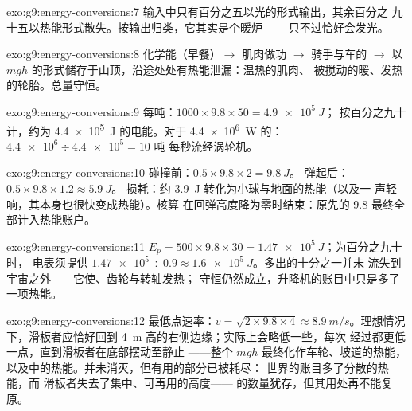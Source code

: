 \begin{solution}{exo:g9:energy-conversions:7}
输入中只有百分之五以光的形式输出，其余百分之
九十五以热能形式散失。按输出归类，它其实是个暖炉——
只不过恰好会发光。
\end{solution}

\begin{solution}{exo:g9:energy-conversions:8}
化学能（早餐）$\to$ 肌肉做功 $\to$ 骑手与车的
 $\to$ 以 $m g
h$ 的形式储存于山顶，沿途处处有热能泄漏：温热的肌肉、
被搅动的暖、发热的轮胎。总量守恒。
\end{solution}

\begin{solution}{exo:g9:energy-conversions:9}
每吨：$1000 \times 9.8 \times 50 = \qty{4.9e5}{J}$；
按百分之九十计，约为 \qty{4.4e5}{J} 的电能。对于
\qty{4.4e6}{W} 的：$\num{4.4e6} \div \num{4.4e5} = 10$ 吨
每秒流经涡轮机。
\end{solution}

\begin{solution}{exo:g9:energy-conversions:10}
碰撞前：$0.5 \times 9.8 \times 2 = \qty{9.8}{J}$。
弹起后：$0.5 \times 9.8 \times 1.2 \approx \qty{5.9}{J}$。
损耗：约 \qty{3.9}{J} 转化为小球与地面的热能（以及一
声轻响，其本身也很快变成热能）。核算
在回弹高度降为零时结束：原先的 $9.8$ 
最终全部计入热能账户。
\end{solution}

\begin{solution}{exo:g9:energy-conversions:11}
$E_p = 500 \times 9.8 \times 30 = \qty{1.47e5}{J}$；为百分之九十时，
电表须提供 $\num{1.47e5} \div 0.9 \approx
\qty{1.6e5}{J}$。多出的十分之一并未
流失到宇宙之外——它使、齿轮与转轴发热；
守恒仍然成立，升降机的账目中只是多了一项热能。
\end{solution}

\begin{solution}{exo:g9:energy-conversions:12}
最低点速率：$v = \sqrt{2 \times 9.8 \times 4} \approx
\qty{8.9}{m/s}$。理想情况下，滑板者应恰好回到
\qty{4}{m} 高的右侧边缘；实际上会略低一些，每次
经过都更低一点，直到滑板者在底部摆动至静止
——整个 $m g h$ 最终化作车轮、坡道的热能，
以及中的热能。并未消灭，但有用的部分已被耗尽：
世界的账目多了分散的热能，而
滑板者失去了集中、可再用的高度——
的数量犹存，但其用处再不能复原。
\end{solution}


